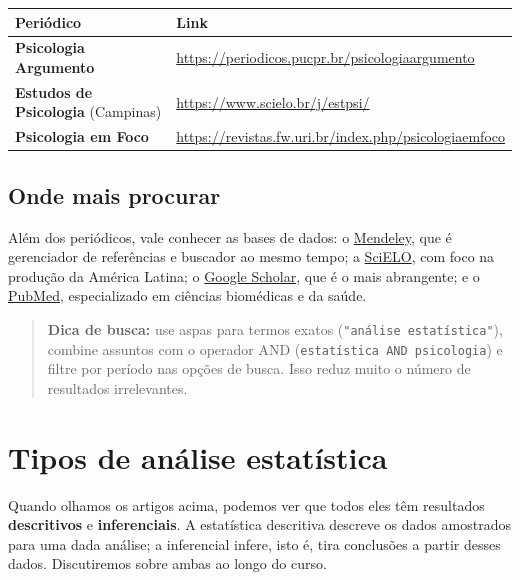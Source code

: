\documentclass[
]{book}
\newcounter{none} %
\begin{document}
{\def\LTcaptype{none} %
\begin{longtable}[]{@{}
  >{\raggedright\arraybackslash}p{}
  >{\raggedright\arraybackslash}p{}@{}}
\toprule\noalign{}
\begin{minipage}[b]{\linewidth}\raggedright
Periódico
\end{minipage} & \begin{minipage}[b]{\linewidth}\raggedright
Link
\end{minipage} \\
\midrule\noalign{}
\endhead
\bottomrule\noalign{}
\endlastfoot
\textbf{Psicologia Argumento} & \url{https://periodicos.pucpr.br/psicologiaargumento} \\
\textbf{Estudos de Psicologia} (Campinas) & \url{https://www.scielo.br/j/estpsi/} \\
\textbf{Psicologia em Foco} & \url{https://revistas.fw.uri.br/index.php/psicologiaemfoco} \\
\end{longtable}
}

\subsection{Onde mais procurar}\label{onde-mais-procurar}

Além dos periódicos, vale conhecer as bases de dados: o \href{https://www.mendeley.com}{Mendeley}, que é gerenciador de referências e buscador ao mesmo tempo; a \href{https://scielo.org}{SciELO}, com foco na produção da América Latina; o \href{https://scholar.google.com}{Google Scholar}, que é o mais abrangente; e o \href{https://pubmed.ncbi.nlm.nih.gov}{PubMed}, especializado em ciências biomédicas e da saúde.

\begin{quote}
\textbf{Dica de busca:} use aspas para termos exatos (\texttt{"análise\ estatística"}), combine assuntos com o operador AND (\texttt{estatística\ AND\ psicologia}) e filtre por período nas opções de busca. Isso reduz muito o número de resultados irrelevantes.
\end{quote}

\section{Tipos de análise estatística}\label{tipos-de-anuxe1lise-estatuxedstica}

Quando olhamos os artigos acima, podemos ver que todos eles têm resultados \textbf{descritivos} e \textbf{inferenciais}. A estatística descritiva descreve os dados amostrados para uma dada análise; a inferencial infere, isto é, tira conclusões a partir desses dados. Discutiremos sobre ambas ao longo do curso.
\end{document}
